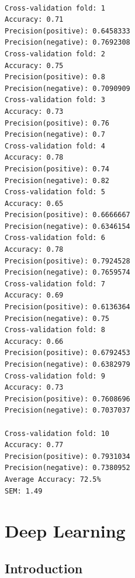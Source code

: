\documentclass[11pt,openany,executivepaper]{book}
\begin{document}
\begin{verbatim}

Cross-validation fold: 1
Accuracy: 0.71
Precision(positive): 0.6458333
Precision(negative): 0.7692308
Cross-validation fold: 2
Accuracy: 0.75
Precision(positive): 0.8
Precision(negative): 0.7090909
Cross-validation fold: 3
Accuracy: 0.73
Precision(positive): 0.76
Precision(negative): 0.7
Cross-validation fold: 4
Accuracy: 0.78
Precision(positive): 0.74
Precision(negative): 0.82
Cross-validation fold: 5
Accuracy: 0.65
Precision(positive): 0.6666667
Precision(negative): 0.6346154
Cross-validation fold: 6
Accuracy: 0.78
Precision(positive): 0.7924528
Precision(negative): 0.7659574
Cross-validation fold: 7
Accuracy: 0.69
Precision(positive): 0.6136364
Precision(negative): 0.75
Cross-validation fold: 8
Accuracy: 0.66
Precision(positive): 0.6792453
Precision(negative): 0.6382979
Cross-validation fold: 9
Accuracy: 0.73
Precision(positive): 0.7608696
Precision(negative): 0.7037037

Cross-validation fold: 10
Accuracy: 0.77
Precision(positive): 0.7931034
Precision(negative): 0.7380952
Average Accuracy: 72.5%
SEM: 1.49
\end{verbatim}

\chapter{Deep Learning} %

\section{Introduction}
\end{document}
